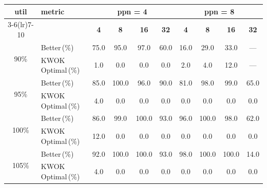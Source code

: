 \begin{tabular}{@{}c l *{8}{c}@{}}
\toprule
\multirow{2}{*}{\textbf{util}} & \multirow{2}{*}{\textbf{metric}} &\multicolumn{4}{c}{\textbf{ppn = 4}} & \multicolumn{4}{c}{\textbf{ppn = 8}}\\
\cmidrule(lr){3-6}\cmidrule(lr){7-10}
 &  & \textbf{4} & \textbf{8} & \textbf{16} & \textbf{32} & \textbf{4} & \textbf{8} & \textbf{16} & \textbf{32}\\
\midrule
\multirow{2}{*}{90\%}
& Better\,(\%) & 75.0 & 95.0 & 97.0 & 60.0 & 16.0 & 29.0 & 33.0 & \multicolumn{1}{c}{—} \\
& KWOK\,Optimal\,(\%) & 1.0 & 0.0 & 0.0 & 0.0 & 2.0 & 4.0 & 12.0 & \multicolumn{1}{c}{—} \\
\midrule
\multirow{2}{*}{95\%}
& Better\,(\%) & 85.0 & 100.0 & 96.0 & 90.0 & 81.0 & 98.0 & 99.0 & 65.0 \\
& KWOK\,Optimal\,(\%) & 4.0 & 0.0 & 0.0 & 0.0 & 0.0 & 0.0 & 0.0 & 0.0 \\
\midrule
\multirow{2}{*}{100\%}
& Better\,(\%) & 86.0 & 99.0 & 100.0 & 93.0 & 96.0 & 100.0 & 98.0 & 62.0 \\
& KWOK\,Optimal\,(\%) & 12.0 & 0.0 & 0.0 & 0.0 & 0.0 & 0.0 & 0.0 & 0.0 \\
\midrule
\multirow{2}{*}{105\%}
& Better\,(\%) & 92.0 & 100.0 & 100.0 & 93.0 & 98.0 & 100.0 & 100.0 & 14.0 \\
& KWOK\,Optimal\,(\%) & 4.0 & 0.0 & 0.0 & 0.0 & 0.0 & 0.0 & 0.0 & 0.0 \\
\bottomrule
\end{tabular}

